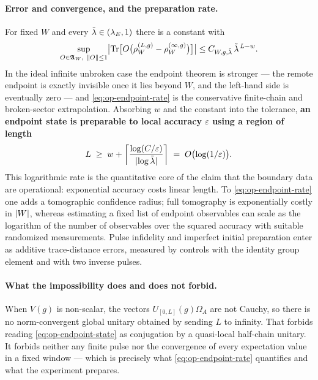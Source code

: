 \paragraph{Error and convergence, and the preparation rate.} For fixed $W$ and
every $\tilde{\lambda}\in(\lambda_E,1)$ there is a constant with
\begin{equation}
  \sup_{O\in\alg_W,\ \norm{O}\le1}
  \bigl|\operatorname{Tr}\bigl[O\bigl(\rho_W^{(L,g)}
        -\rho_W^{(\infty,g)}\bigr)\bigr]\bigr|
  \le C_{W,g,\lamt}\,\lamt^{\,L-w}.
  \label{eq:op-endpoint-rate}
\end{equation}
In the ideal infinite unbroken case the endpoint theorem is stronger --- the
remote endpoint is exactly invisible once it lies beyond $W$, and the left-hand
side is eventually zero --- and \eqref{eq:op-endpoint-rate} is the conservative
finite-chain and broken-sector extrapolation. Absorbing $w$ and the constant
into the tolerance, \textbf{an endpoint state is preparable to local accuracy
$\varepsilon$ using a region of length}
\begin{equation}
  L \;\ge\; w+\left\lceil
        \frac{\log(C/\varepsilon)}{\lvert \log\tilde{\lambda}\rvert}\right\rceil
    \;=\;O\bigl(\log(1/\varepsilon)\bigr).
  \label{eq:op-endpoint-cost}
\end{equation}
This logarithmic rate is the quantitative core of the claim that the boundary
data are operational: exponential accuracy costs linear length. To
\eqref{eq:op-endpoint-rate} one adds a tomographic confidence radius; full
tomography is exponentially costly in $\lvert W\rvert$, whereas estimating a fixed
list of endpoint observables can scale as the logarithm of the number of
observables over the squared accuracy with suitable randomized measurements.
Pulse infidelity and imperfect initial preparation enter as additive
trace-distance errors, measured by controls with the identity group element and
with two inverse pulses.

\paragraph{What the impossibility does and does not forbid.} When $V(g)$ is
non-scalar, the vectors $U_{[0,L]}(g)\Omega_A$ are not Cauchy, so there is no
norm-convergent global unitary obtained by sending $L$ to infinity. That
forbids reading \eqref{eq:op-endpoint-state} as conjugation by a quasi-local
half-chain unitary. It forbids neither any finite pulse nor the convergence of
every expectation value in a fixed window --- which is precisely what
\eqref{eq:op-endpoint-rate} quantifies and what the experiment prepares.

